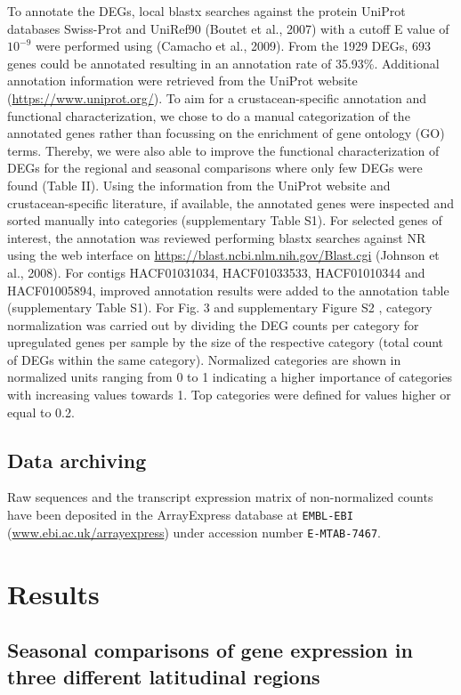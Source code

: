 To annotate the DEGs, local blastx searches against the protein UniProt
databases Swiss-Prot and UniRef90 (Boutet et al., 2007) with a cutoff E value
of $10^{-9}$ were performed using  (Camacho et al., 2009). From the
1929 DEGs, 693 genes could be annotated resulting in an annotation rate of
35.93\%. Additional annotation information were retrieved from the UniProt
website (\url{https://www.uniprot.org/}). To aim for a crustacean-specific annotation
and functional characterization, we chose to do a manual categorization of the
annotated genes rather than focussing on the enrichment of gene ontology (GO)
terms. Thereby, we were also able to improve the functional characterization of
DEGs for the regional and seasonal comparisons where only few DEGs were found
(Table II). Using the information from the UniProt website and
crustacean-specific literature, if available, the annotated genes were
inspected and sorted manually into categories (supplementary Table S1). For
selected genes of interest, the annotation was reviewed performing blastx
searches against NR using the web interface on
\url{https://blast.ncbi.nlm.nih.gov/Blast.cgi}  (Johnson et al., 2008). For
contigs HACF01031034, HACF01033533, HACF01010344 and HACF01005894, improved
annotation results were added to the annotation table (supplementary Table S1).
For Fig. 3 and supplementary Figure S2 , category normalization was carried out
by dividing the DEG counts per category for upregulated genes per sample by the
size of the respective category (total count of DEGs within the same category).
Normalized categories are shown in normalized units ranging from 0 to 1
indicating a higher importance of categories with increasing values towards 1.
Top categories were defined for values higher or equal to 0.2.

\subsection*{Data archiving}

Raw sequences and the transcript expression matrix of non-normalized counts
have been deposited in the ArrayExpress database at \texttt{EMBL-EBI}
(\url{www.ebi.ac.uk/arrayexpress}) under accession number \texttt{E-MTAB-7467}.

\section{Results}

\subsection*{Seasonal comparisons of gene expression in three different latitudinal regions}

